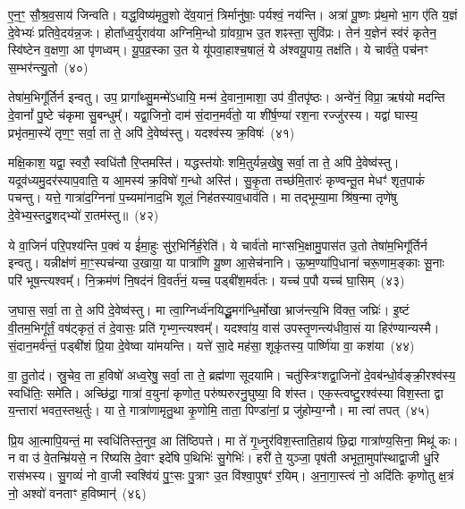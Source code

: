 ए॒न॒ꣳ॒ सौ॒श्र॒व॒साय॑ जिन्वति। यद्ध॒विष्य॑मृतु॒शो दे॑व॒यानं॒ त्रिर्मानु॑षाः॒ पर्यश्वं॒ नय॑न्ति। अत्रा॑ पू॒ष्णः प्र॑थ॒मो भा॒ग ए॑ति य॒ज्ञं दे॒वेभ्यः॑ प्रतिवे॒दय॑न्न॒जः। होता᳚ध्व॒र्युराव॑या अग्निमि॒न्धो ग्रा॑वग्रा॒भ उ॒त शꣴस्ता॒ सुवि॑प्रः। तेन॑ य॒ज्ञेन॑ स्व॑रं कृतेन॒ स्वि॑ष्टेन व॒क्षणा॒ आ पृ॑णध्वम्। यू॒प॒व्र॒स्का उ॒त ये यू॑पवा॒हाश्च॒षालं॒ ये अ॑श्वयू॒पाय॒ तक्ष॑ति। ये चार्व॑ते॒ पच॑नꣳ स॒म्भर॑न्त्यु॒तो~(४०)

तेषा॑म॒भिगू᳚र्तिर्न इन्वतु। उप॒ प्रागा᳚थ्सु॒मन्मे॑\-ऽधायि॒ मन्म॑ दे॒वाना॒माशा॒ उप॑ वी॒तपृ॑ष्ठः। अन्वे॑नं॒ विप्रा॒ ऋष॑यो मदन्ति दे॒वानां᳚ पु॒ष्टे च॑कृमा सु॒बन्धुम्᳚। यद्वा॒जिनो॒ दाम॑ सं॒दान॒मर्व॑तो॒ या शी॑र्\mbox{}ष॒ण्या॑ रश॒ना रज्जु॑रस्य। यद्वा॑ घास्य॒ प्रभृ॑तमा॒स्ये॑ तृण॒ꣳ॒ सर्वा॒ ता ते॒ अपि॑ दे॒वेष्व॑स्तु। यदश्व॑स्य क्र॒विषः॑~(४१)

मक्षि॒काश॒ यद्वा॒ स्वरौ॒ स्वधि॑तौ रि॒प्तमस्ति॑। यद्धस्त॑योः शमि॒तुर्यन्न॒खेषु॒ सर्वा॒ ता ते॒ अपि॑ दे॒वेष्व॑स्तु। यदूव॑ध्यमु॒दर॑स्याप॒वाति॒ य आ॒मस्य॑ क्र॒विषो॑ ग॒न्धो अस्ति॑। सु॒कृ॒ता तच्छ॑मि॒तारः॑ कृण्वन्तू॒त मेधꣳ॑ शृत॒पाकं॑ पचन्तु। यत्ते॒ गात्रा॑द॒ग्निना॑ प॒च्यमा॑नाद॒भि शूलं॒ निह॑तस्याव॒धाव॑ति। मा तद्भूम्या॒मा श्रि॑ष॒न्मा तृणे॑षु दे॒वेभ्य॒स्तदु॒शद्भ्यो॑ रा॒तम॑स्तु॥~(४२)

{\anuvakamend[{इदु॒तो क्र॒विषः॑ श्रिषथ्स॒प्त च॑}]}%

ये वा॒जिनं॑ परि॒पश्य॑न्ति प॒क्वं य ई॑मा॒हुः सु॑र॒भिर्निर्\mbox{}ह॒रेति॑। ये चार्व॑तो माꣳसभि॒क्षामु॒पास॑त उ॒तो तेषा॑म॒भिगू᳚र्तिर्न इन्वतु। यन्नीक्ष॑णं मा॒ꣳ॒स्पच॑न्या उ॒खाया॒ या पात्रा॑णि यू॒ष्ण आ॒सेच॑नानि। ऊ॒ष्म॒ण्या॑पि॒धाना॑ चरू॒णाम॒ङ्काः सू॒नाः परि॑ भूष॒न्त्यश्वम्᳚। नि॒क्रम॑णं नि॒षद॑नं वि॒वर्त॑नं॒ यच्च॒ पड्बी॑श॒मर्व॑तः। यच्च॑ प॒पौ यच्च॑ घा॒सिम्~(४३)

ज॒घास॒ सर्वा॒ ता ते॒ अपि॑ दे॒वेष्व॑स्तु। मा त्वा॒ग्निर्ध्व॑नयिद्धू॒मग॑न्धि॒र्मोखा भ्राज॑न्त्य॒भि वि॑क्त॒ जघ्रिः॑। इ॒ष्टं वी॒तम॒भिगू᳚र्तं॒ वष॑ट्कृतं॒ तं दे॒वासः॒ प्रति॑ गृभ्ण॒न्त्यश्वम्᳚। यदश्वा॑य॒ वास॑ उपस्तृ॒णन्त्य॑धीवा॒सं या हिर॑ण्यान्यस्मै। सं॒दान॒मर्व॑न्तं॒ पड्बी॑शं प्रि॒या दे॒वेष्वा या॑मयन्ति। यत्ते॑ सा॒दे मह॑सा॒ शूकृ॑तस्य॒ पार्ष्णि॑या वा॒ कश॑या~(४४)

वा॒ तु॒तोद॑। स्रु॒चेव॒ ता ह॒विषो॑ अध्व॒रेषु॒ सर्वा॒ ता ते॒ ब्रह्म॑णा सूदयामि। चतु॑स्त्रिꣳशद्वा॒जिनो॑ दे॒वब॑न्धो॒र्वङ्क्री॒रश्व॑स्य॒ स्वधि॑तिः॒ समे॑ति। अच्छि॑द्रा॒ गात्रा॑ व॒युना॑ कृणोत॒ परु॑ष्परुरनु॒घुष्या॒ वि श॑स्त। एक॒स्त्वष्टु॒रश्व॑स्या विश॒स्ता द्वा य॒न्तारा॑ भवत॒स्तथ॒र्तुः। या ते॒ गात्रा॑णामृतु॒था कृ॒णोमि॒ ताता॒ पिण्डा॑नां॒ प्र जु॑होम्य॒ग्नौ। मा त्वा॑ तपत्~(४५)

प्रि॒य आ॒त्मापि॒यन्तं॒ मा स्वधि॑तिस्त॒नुव॒ आ ति॑ष्ठिपत्ते। मा ते॑ गृ॒ध्नुर॑विश॒स्ताति॒हाय॑ छि॒द्रा गात्रा॑ण्य॒सिना॒ मिथू॑ कः। न वा उ॑ वे॒तन्म्रि॑यसे॒ न रि॑ष्यसि दे॒वाꣳ इदे॑षि प॒थिभिः॑ सु॒गेभिः॑। हरी॑ ते॒ युञ्जा॒ पृष॑ती अभूता॒मुपा᳚स्थाद्वा॒जी धु॒रि रास॑भस्य। सु॒गव्यं॑ नो वा॒जी स्वश्वि॑यं पु॒ꣳ॒सः पु॒त्राꣳ उ॒त वि॑श्वा॒पुषꣳ॑ र॒यिम्। अ॒ना॒गा॒स्त्वं नो॒ अदि॑तिः कृणोतु क्ष॒त्रं नो॒ अश्वो॑ वनताꣳ ह॒विष्मान्॑~(४६)


